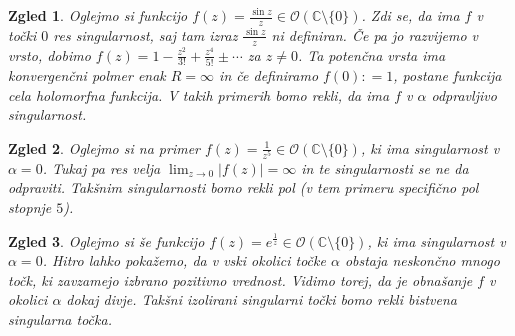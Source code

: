 \documentclass[10pt, a4paper]{article}
\newtheorem{zgled}{Zgled}[section]
\newcommand{\C}{\mathbb {C}}
\begin{document}
\begin{zgled}
  Oglejmo si funkcijo $f(z) = \frac{\sin z}{z} \in \mathcal{O} (\C \setminus \{0\})$.
  Zdi se, da ima $f$ v točki $0$ res singularnost,
  saj tam izraz $\frac{\sin z}{z}$ ni definiran. 
  Če pa jo razvijemo v vrsto, dobimo $f(z) = 1 - \frac{z^2}{3!} + \frac{z^4}{5!} \pm \cdots$
  za $z \neq 0$. Ta potenčna vrsta ima konvergenčni polmer enak $R = \infty$ in če definiramo 
  $f(0): = 1$, postane funkcija cela holomorfna funkcija.
  V takih primerih bomo rekli, da ima $f$ v $\alpha$ odpravljivo singularnost.
\end{zgled}

\begin{zgled}
  Oglejmo si na primer $f(z) = \frac{1}{z^5} \in \mathcal{O}(\C \setminus \{0\})$, ki ima singularnost v $\alpha = 0$.
  Tukaj pa res velja $\lim_{z \to 0} |f(z)| = \infty$ in te singularnosti se ne da odpraviti.
  Takšnim singularnosti bomo rekli pol (v tem primeru specifično pol stopnje $5$).
\end{zgled}

\begin{zgled}
  Oglejmo si še funkcijo $f(z) = e^{\frac{1}{z}} \in \mathcal{O} (\C \setminus \{0\})$, ki ima singularnost v $\alpha = 0$.
  Hitro lahko pokažemo, da v vski okolici točke $\alpha$ obstaja neskončno mnogo točk, ki zavzamejo izbrano 
  pozitivno vrednost. Vidimo torej, da je obnašanje $f$ v okolici $\alpha$ dokaj divje.
  Takšni izolirani singularni točki bomo rekli bistvena singularna točka.
\end{zgled}
\end{document}
